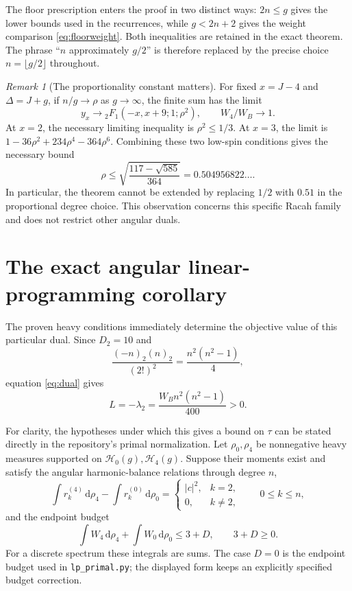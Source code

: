 \documentclass[11pt]{article}
\theoremstyle{remark}
\newtheorem{remark}[theorem]{Remark}
\numberwithin{equation}{section}
\newcommand{\WB}{W_B}
\newcommand{\dd}{\mathrm d}
\newcommand{\cH}{\mathcal H}
\begin{document}
The floor prescription enters the proof in two distinct ways:
$2n\le g$ gives the lower bounds used in the recurrences, while
$g<2n+2$ gives the weight comparison \eqref{eq:floorweight}.
Both inequalities are retained in the exact theorem. The phrase
``$n$ approximately $g/2$'' is therefore replaced by the precise choice
$n=\lfloor g/2\rfloor$ throughout.

\begin{remark}[The proportionality constant matters]
\label{rem:ratio}
For fixed $x=J-4$ and $\Delta=J+g$, if $n/g\to\rho$ as $g\to\infty$,
the finite sum has the limit
\[
 y_x\longrightarrow{}_2F_1(-x,x+9;1;\rho^2),
 \qquad W_4/\WB\longrightarrow1.
\]
At $x=2$, the necessary limiting inequality is $\rho^2\le1/3$.
At $x=3$, the limit is $1-36\rho^2+234\rho^4-364\rho^6$.
Combining these two low-spin conditions gives the necessary bound
\begin{equation}
 \rho\le\sqrt{\frac{117-\sqrt{585}}{364}}
 =0.504956822\ldots.
 \label{eq:rhomax}
\end{equation}
In particular, the theorem cannot be extended by replacing $1/2$ with
$0.51$ in the proportional degree choice. This observation concerns this
specific Racah family and does not restrict other angular duals.
\end{remark}

\section{The exact angular linear-programming corollary}
\label{sec:LP}

The proven heavy conditions immediately determine the objective value of
this particular dual. Since $D_2=10$ and
\[
 \frac{(-n)_2(n)_2}{(2!)^2}=\frac{n^2(n^2-1)}4,
\]
equation \eqref{eq:dual} gives
\begin{equation}
 \boxed{\quad L=-\lambda_2=\frac{\WB n^2(n^2-1)}{400}>0.\quad}
 \label{eq:L}
\end{equation}

For clarity, the hypotheses under which this gives a bound on $\tau$ can
be stated directly in the repository's primal normalization. Let
$\rho_0,\rho_4$ be nonnegative heavy measures supported on
$\cH_0(g),\cH_4(g)$. Suppose their moments exist and satisfy the angular
harmonic-balance relations through degree $n$,
\begin{equation}
 \int r_k^{(4)}\,\dd\rho_4-\int r_k^{(0)}\,\dd\rho_0
 =\begin{cases}|c|^2,&k=2,\\0,&k\ne2,\end{cases}
 \qquad 0\le k\le n,
 \label{eq:LPmoments}
\end{equation}
and the endpoint budget
\begin{equation}
 \int W_4\,\dd\rho_4+\int W_0\,\dd\rho_0\le3+D,
 \qquad 3+D\ge0.
 \label{eq:LPbudget}
\end{equation}
For a discrete spectrum these integrals are sums. The case $D=0$ is the
endpoint budget used in \texttt{lp\_primal.py}; the displayed form keeps
an explicitly specified budget correction.
\end{document}
